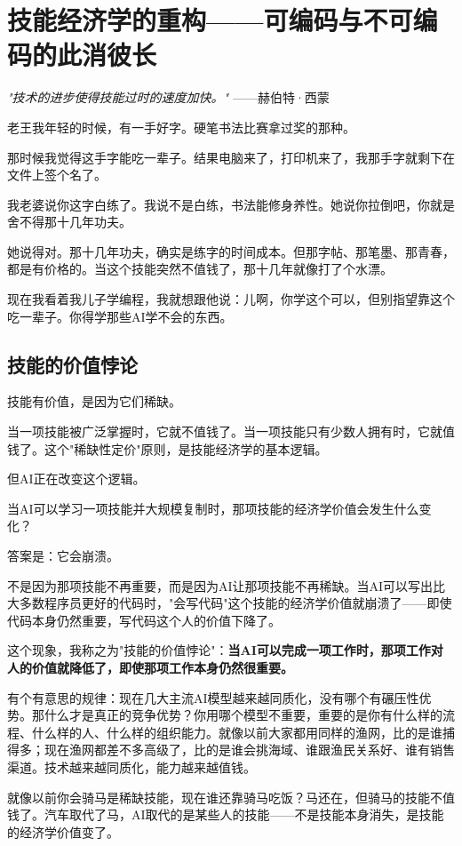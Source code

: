 \chapter{技能经济学的重构——可编码与不可编码的此消彼长}


\textit{"技术的进步使得技能过时的速度加快。"}
——赫伯特·西蒙


老王我年轻的时候，有一手好字。硬笔书法比赛拿过奖的那种。

那时候我觉得这手字能吃一辈子。结果电脑来了，打印机来了，我那手字就剩下在文件上签个名了。

我老婆说你这字白练了。我说不是白练，书法能修身养性。她说你拉倒吧，你就是舍不得那十几年功夫。

她说得对。那十几年功夫，确实是练字的时间成本。但那字帖、那笔墨、那青春，都是有价格的。当这个技能突然不值钱了，那十几年就像打了个水漂。

现在我看着我儿子学编程，我就想跟他说：儿啊，你学这个可以，但别指望靠这个吃一辈子。你得学那些AI学不会的东西。

\section{技能的价值悖论}


技能有价值，是因为它们稀缺。

当一项技能被广泛掌握时，它就不值钱了。当一项技能只有少数人拥有时，它就值钱了。这个"稀缺性定价"原则，是技能经济学的基本逻辑。

但AI正在改变这个逻辑。

当AI可以学习一项技能并大规模复制时，那项技能的经济学价值会发生什么变化？

答案是：它会崩溃。

不是因为那项技能不再重要，而是因为AI让那项技能不再稀缺。当AI可以写出比大多数程序员更好的代码时，"会写代码"这个技能的经济学价值就崩溃了——即使代码本身仍然重要，写代码这个人的价值下降了。

这个现象，我称之为"技能的价值悖论"：\textbf{当AI可以完成一项工作时，那项工作对人的价值就降低了，即使那项工作本身仍然很重要。}

有个有意思的规律：现在几大主流AI模型越来越同质化，没有哪个有碾压性优势。那什么才是真正的竞争优势？你用哪个模型不重要，重要的是你有什么样的流程、什么样的人、什么样的组织能力。就像以前大家都用同样的渔网，比的是谁捕得多；现在渔网都差不多高级了，比的是谁会挑海域、谁跟渔民关系好、谁有销售渠道。技术越来越同质化，能力越来越值钱。

就像以前你会骑马是稀缺技能，现在谁还靠骑马吃饭？马还在，但骑马的技能不值钱了。汽车取代了马，AI取代的是某些人的技能——不是技能本身消失，是技能的经济学价值变了。

